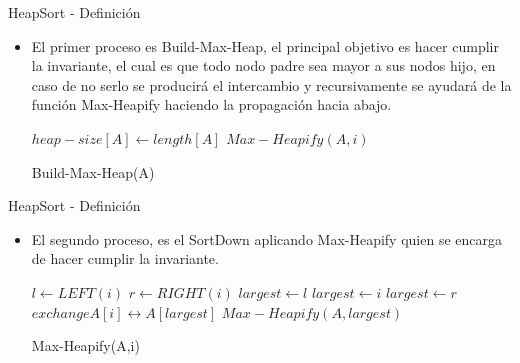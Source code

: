 \documentclass[11pt]{beamer}
\begin{document}
    		\begin{frame}{HeapSort - Definición}
    		     \begin{itemize}
    		         \item El primer proceso es Build-Max-Heap, el principal objetivo es hacer cumplir la invariante, el cual es que todo nodo padre sea mayor a sus nodos hijo, en caso de no serlo se producir\'{a} el intercambio y recursivamente se ayudar\'{a} de la funci\'{o}n Max-Heapify haciendo la propagaci\'{o}n hacia abajo.
    		         
    		        \begin{algorithm}[H]
                        \begin{algorithmic}[1]
                            \STATE $heap-size[A] \leftarrow length[A]$
                                \STATE $Max-Heapify(A,i)$
                            \ENDFOR
                        \end{algorithmic}
                        \caption{Build-Max-Heap(A)}
                        \label{alg:build-max-heap}
                    \end{algorithm}
    		     \end{itemize}
    		\end{frame}
    		\begin{frame}{HeapSort - Definición}
    		     \begin{itemize}
    		         \item El segundo proceso, es el SortDown aplicando Max-Heapify quien se encarga de hacer cumplir la invariante.
    		         
    		        \begin{algorithm}[H]
                        \begin{algorithmic}[1]
                            \STATE $l \leftarrow LEFT(i)$
                            \STATE $r \leftarrow RIGHT(i)$
                                \STATE $largest \leftarrow l$
                            \ELSE
                                \STATE $largest \leftarrow i$
                            \ENDIF
                                \STATE $largest \leftarrow r$
                            \ENDIF
                                \STATE $exchange A[i] \leftrightarrow A[largest]$
                                \STATE $Max-Heapify(A, largest)$
                            \ENDIF
                        \end{algorithmic}
                        \caption{Max-Heapify(A,i)}
                        \label{alg:max-heapify}
                    \end{algorithm}
    		     \end{itemize}
    		\end{frame}
\end{document}
